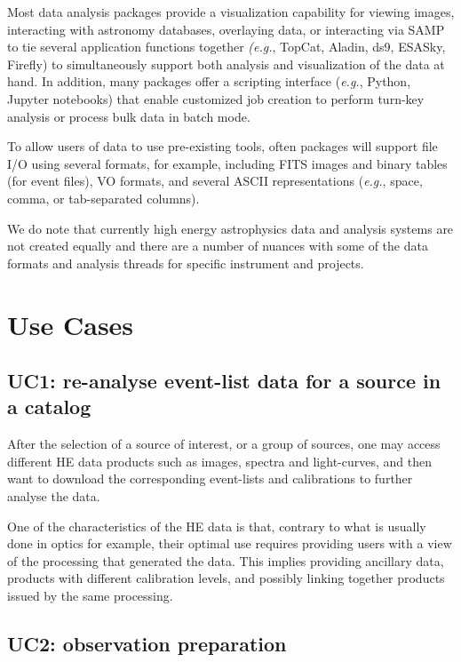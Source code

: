 \documentclass[11pt,a4paper]{ivoa}
\begin{document}
Most data analysis packages provide a visualization capability for viewing images, interacting with astronomy databases, overlaying data, or interacting via SAMP to tie several application functions together {\em (e.g.\/}, TopCat, Aladin, ds9, ESASky, Firefly) to simultaneously support both analysis and visualization of the data at hand.  In addition, many packages offer a scripting interface ({\em e.g.\/}, Python, Jupyter notebooks) that enable customized job creation to perform turn-key analysis or process bulk data in batch mode.

To allow users of data to use pre-existing tools, often packages will support file I/O using several formats, for example, including FITS images and binary tables (for event files), VO formats, and several ASCII representations ({\em e.g.\/}, space, comma, or tab-separated columns).

We do note that currently high energy astrophysics data and analysis systems are not created equally and there are a number of nuances with some of the data formats and analysis threads for specific instrument and projects.

\section{Use Cases}

\subsection{UC1: re-analyse event-list data for a source in a catalog}

After the selection of a source of interest, or a group of sources, one may access different HE data products such as
images, spectra and light-curves, and then want to download the corresponding event-lists and calibrations to further
analyse the data.

One of the characteristics of the HE data is that, contrary to what is usually done in optics for example, their optimal
use requires providing users with a view of the processing that generated the data. This implies providing ancillary data,
products with different calibration levels, and possibly linking together products issued by the same processing.


\subsection{UC2: observation preparation}
\end{document}
